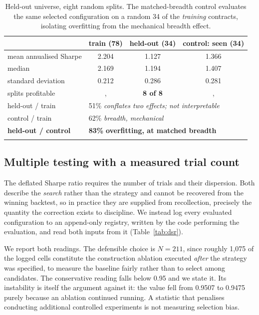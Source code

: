 \documentclass[11pt,letterpaper]{article}
\begin{document}
\begin{table}[!htbp]\centering
\caption{Held-out universe, eight random splits. The matched-breadth control
evaluates the same selected configuration on a random 34 of the \emph{training}
contracts, isolating overfitting from the mechanical breadth effect.}
\label{tab:holdout}
\begin{tabular}{lccc}
\toprule
 & train (78) & held-out (34) & control: seen (34) \\
\midrule\addlinespace[2pt]
mean annualised Sharpe & 2.204 & 1.127 & 1.366 \\
median & 2.169 & 1.194 & 1.407 \\
standard deviation & 0.212 & 0.286 & 0.281 \\
splits profitable & , & \textbf{8 of 8} & , \\
\midrule\addlinespace[2pt]
held-out / train & \multicolumn{3}{l}{51\% \quad \emph{conflates two effects; not interpretable}} \\
control / train & \multicolumn{3}{l}{62\% \quad \emph{breadth, mechanical}} \\
\textbf{held-out / control} & \multicolumn{3}{l}{\textbf{83\%} \quad \textbf{overfitting, at matched breadth}} \\
\addlinespace[2pt]
\bottomrule
\end{tabular}
\end{table}

\subsection{Multiple testing with a measured trial count}

The deflated Sharpe ratio \citep{bailey2014} requires the number of trials and
their dispersion. Both describe the \emph{search} rather than the strategy and
cannot be recovered from the winning backtest, so in practice they are supplied
from recollection, precisely the quantity the correction exists to discipline.
We instead log every evaluated configuration to an append-only registry, written
by the code performing the evaluation, and read both inputs from it
(Table~\ref{tab:dsr}).

We report both readings. The defensible choice is $N=211$, since roughly 1,075 of
the logged cells constitute the construction ablation executed \emph{after} the
strategy was specified, to measure the baseline fairly rather than to select among
candidates. The conservative reading falls below 0.95 and we state it. Its
instability is itself the argument against it: the value fell from 0.9507 to
0.9475 purely because an ablation continued running. A statistic that penalises
conducting additional controlled experiments is not measuring selection bias.
\end{document}
